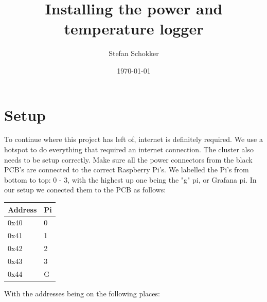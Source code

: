 \documentclass[a4paper, 12pt, one column, aas_macros]{article}
\begin{document}
\begin{titlepage}
    \title{
        Installing the power and temperature logger
    }
    \author{Stefan Schokker}
    \date{\today}
    \thispagestyle{empty}
\end{titlepage}

\maketitle
\thispagestyle{empty}

\newpage
\thispagestyle{empty}
\tableofcontents
\newpage

\setcounter{page}{1}
\section{Setup}
To continue where this project has left of, internet is definitely required. We use a hotspot to do everything that required an internet connection.\newline
The cluster also needs to be setup correctly. Make sure all the power connectors from the black PCB's are connected to the correct Raspberry Pi's. We labelled the Pi's from bottom to top: 0 - 3, with the highest up one being the "g" pi, or Grafana pi. In our setup we conected them to the PCB as follows:
\begin{table}[h]
\centering
\begin{tabular}{|l|l|}
\hline
Address & Pi \\ \hline
0x40 & 0 \\ \hline
0x41 & 1 \\ \hline
0x42 & 2 \\ \hline
0x43 & 3 \\ \hline
0x44 & G \\ \hline
\end{tabular}
\end{table}
\newline
With the addresses being on the following places:
\end{document}

